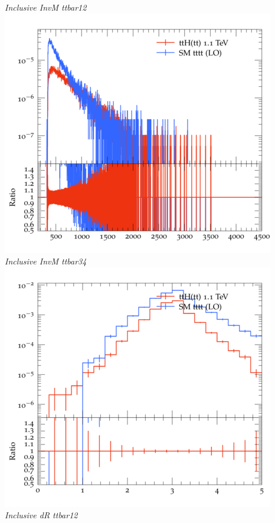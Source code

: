 \documentclass{beamer}
\begin{document}
\begin{frame}
\begin{columns}
\textit{\small Inclusive InvM ttbar12}
\includegraphics[width=\textwidth]{../plots/ttH_1100/tttt_ttH/Inclusive_InvM_ttbar34.png}\\
\textit{\small Inclusive InvM ttbar34}
\includegraphics[width=\textwidth]{../plots/ttH_1100/tttt_ttH/Inclusive_dR_ttbar12.png}\\
\textit{\small Inclusive dR ttbar12}
\end{columns}
\end{frame}
\end{document}
